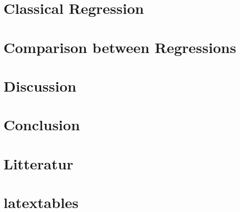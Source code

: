 \documentclass{article}
\begin{document}
	\section{Classical Regression}
	\newpage
	
	
%	
	
	
%	
	
	
	\section{Comparison between Regressions}
	
	\newpage
	
	\section{Discussion}
	\newpage
	
	\section{Conclusion}
	\newpage
	
 	\section{Litteratur}
 	
 	\section{latextables}
 	\newpage
  
\end{document}

